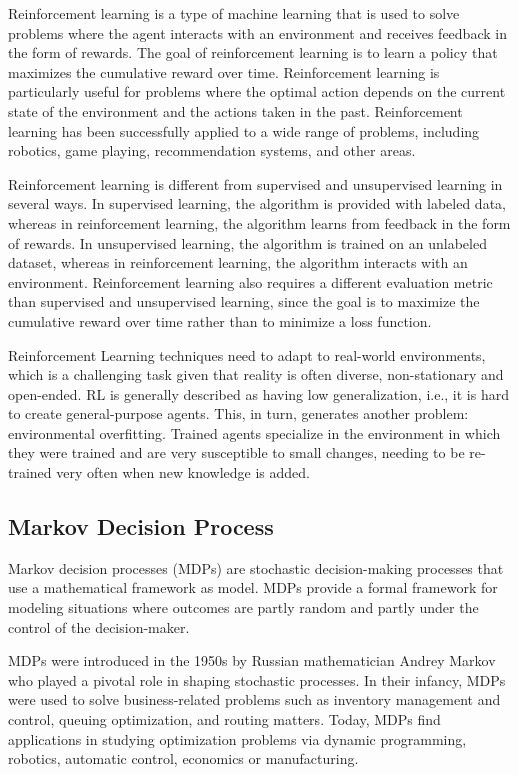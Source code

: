 Reinforcement learning is a type of machine learning that is used to solve problems where the agent interacts with an environment and receives feedback in the form of rewards. The goal of reinforcement learning is to learn a policy that maximizes the cumulative reward over time. Reinforcement learning is particularly useful for problems where the optimal action depends on the current state of the environment and the actions taken in the past. Reinforcement learning has been successfully applied to a wide range of problems, including robotics\cite{}, game playing\cite{}, recommendation systems\cite{}, and other areas.

Reinforcement learning is different from supervised and unsupervised learning in several ways. In supervised learning, the algorithm is provided with labeled data, whereas in reinforcement learning, the algorithm learns from feedback in the form of rewards. In unsupervised learning, the algorithm is trained on an unlabeled dataset, whereas in reinforcement learning, the algorithm interacts with an environment. Reinforcement learning also requires a different evaluation metric than supervised and unsupervised learning, since the goal is to maximize the cumulative reward over time rather than to minimize a loss function.

Reinforcement Learning techniques need to adapt to real-world environments, which is a challenging task given that reality is often diverse, non-stationary and open-ended. RL is generally described as having low generalization, i.e., it is hard to create general-purpose agents. This, in turn, generates another problem: environmental overfitting. Trained agents specialize in the environment in which they were trained and are very susceptible to small changes, needing to be re-trained very often when new knowledge is added\cite{}.

\subsection*{Markov Decision Process}
Markov decision processes (MDPs) are stochastic decision-making processes that use a mathematical framework as model. MDPs provide a formal framework for modeling situations where outcomes are partly random and partly under the control of the decision-maker. 

MDPs were introduced in the 1950s by Russian mathematician Andrey Markov who played a pivotal role in shaping stochastic processes. In their infancy, MDPs were used to solve business-related problems such as inventory management and control, queuing optimization, and routing matters. Today, MDPs find applications in studying optimization problems via dynamic programming, robotics, automatic control, economics or manufacturing.

